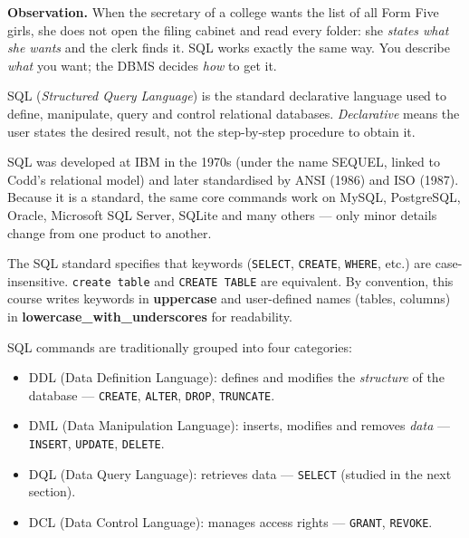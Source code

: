 \documentclass[11pt]{article}
\newcommand{\cle}[1]{{\popxbold\color{popdark}#1}}
\newcounter{popsec}
\newcounter{popsub}
\newcommand{\courssub}[1]{%
  \stepcounter{popsub}%
  \par\vspace{9pt}\noindent{\popxbold\fontsize{11.5}{13}\selectfont\color{popink}{\color{poporange}\thepopsec.\thepopsub}\hspace{6pt}#1}\par\nopagebreak\vspace{4pt}
}
\begin{document}
\courssub{Introduction to SQL}

\textbf{Observation.} When the secretary of a college wants the list of all Form Five girls, she does not open the filing cabinet and read every folder: she \emph{states what she wants} and the clerk finds it. SQL works exactly the same way. You describe \emph{what} you want; the DBMS decides \emph{how} to get it.

\begin{definition}[SQL]
\cle{SQL} (\emph{Structured Query Language}) is the standard \cle{declarative} language used to define, manipulate, query and control relational databases. \emph{Declarative} means the user states the desired result, not the step-by-step procedure to obtain it.
\end{definition}

SQL was developed at IBM in the 1970s (under the name SEQUEL, linked to Codd's relational model) and later standardised by ANSI (1986) and ISO (1987). Because it is a standard, the same core commands work on MySQL, PostgreSQL, Oracle, Microsoft SQL Server, SQLite and many others — only minor details change from one product to another.

\begin{aretenir}
The SQL standard specifies that keywords (\texttt{SELECT}, \texttt{CREATE}, \texttt{WHERE}, etc.) are case-insensitive. \texttt{create table} and \texttt{CREATE TABLE} are equivalent. By convention, this course writes keywords in \textbf{uppercase} and user-defined names (tables, columns) in \textbf{lowercase\_with\_underscores} for readability.
\end{aretenir}

SQL commands are traditionally grouped into four categories:

\begin{itemize}
\item \cle{DDL} (Data Definition Language): defines and modifies the \emph{structure} of the database — \texttt{CREATE}, \texttt{ALTER}, \texttt{DROP}, \texttt{TRUNCATE}.
\item \cle{DML} (Data Manipulation Language): inserts, modifies and removes \emph{data} — \texttt{INSERT}, \texttt{UPDATE}, \texttt{DELETE}.
\item \cle{DQL} (Data Query Language): retrieves data — \texttt{SELECT} (studied in the next section).
\item \cle{DCL} (Data Control Language): manages access rights — \texttt{GRANT}, \texttt{REVOKE}.
\end{itemize}
\end{document}
